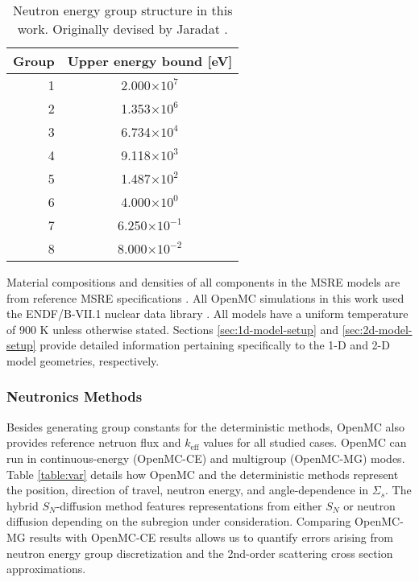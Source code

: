 \begin{table}[htb]
  \centering
  \caption{Neutron energy group structure in this work. Originally devised by Jaradat
  \cite{jaradat_development_2021-1}.}
  \begin{tabular}{r S}
    \toprule
    Group & {Upper energy bound [eV]} \\
     & 2.000$\times 10^7$ \\
    2 & 1.353$\times 10^6$ \\
    3 & 6.734$\times 10^4$ \\
    4 & 9.118$\times 10^3$ \\
    5 & 1.487$\times 10^2$ \\
    6 & 4.000$\times 10^0$ \\
    7 & 6.250$\times 10^{-1}$ \\
    8 & 8.000$\times 10^{-2}$ \\
    \bottomrule
  \end{tabular}
  \label{table:energy-group}
\end{table}

Material compositions and densities of all components in the \gls{MSRE} models are from reference
\gls{MSRE} specifications \cite{robertson_msre_1965, fratoni_molten_2020}.
All OpenMC simulations in this work used the ENDF/B-VII.1 nuclear data library
\cite{chadwick_endf/b-vii.1_2011}. All models have a uniform
temperature of 900 K unless otherwise stated. Sections \ref{sec:1d-model-setup} and
\ref{sec:2d-model-setup} provide detailed information pertaining
specifically to the 1-D and 2-D model geometries, respectively.

\subsubsection{Neutronics Methods} \label{sec:nts-methods}

Besides generating group constants for the deterministic methods, OpenMC also provides reference
netruon flux and $k_\text{eff}$ values for all studied cases. OpenMC can run in continuous-energy
(OpenMC-CE) and multigroup (OpenMC-MG) modes. Table
\ref{table:var} details how OpenMC and the deterministic methods represent the position, direction
of travel, neutron energy, and angle-dependence in $\Sigma_s$. The hybrid $S_N$-diffusion method
features representations from either $S_N$ or neutron diffusion depending on the subregion under
consideration. Comparing OpenMC-MG results with OpenMC-CE results allows us
to quantify errors arising from neutron energy group discretization and the 2nd-order scattering
cross section approximations.

